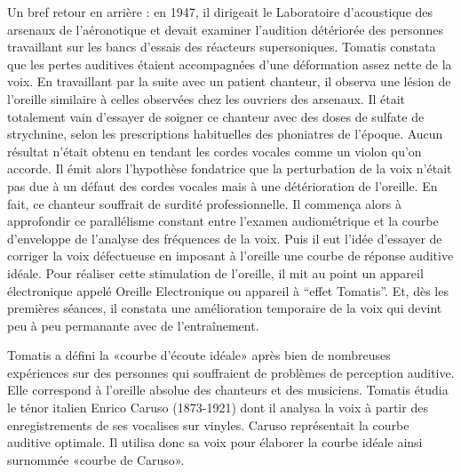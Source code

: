 \documentclass[12pt,french]{report}
\begin{document}
Un bref retour en arrière : en 1947, il dirigeait le Laboratoire d'acoustique
des arsenaux de l'aéronotique et devait examiner l'audition détériorée
des personnes travaillant sur les bancs d'essais des réacteurs supersoniques.
Tomatis constata que les pertes auditives étaient accompagnées d'une
déformation assez nette de la voix. En travaillant par la suite avec
un patient chanteur, il observa une lésion de l'oreille similaire
à celles observées chez les ouvriers des arsenaux. Il était totalement
vain d'essayer de soigner ce chanteur avec des doses de sulfate de
strychnine, selon les prescriptions habituelles des phoniatres de
l'époque. Aucun résultat n'était obtenu en tendant les cordes vocales
comme un violon qu'on accorde. Il émit alors l'hypothèse fondatrice
que la perturbation de la voix n'était pas due à un défaut des cordes
vocales mais à une détérioration de l'oreille. En fait, ce chanteur
souffrait de surdité professionnelle. Il commença alors à approfondir
ce parallélisme constant entre l'examen audiométrique et la courbe
d'enveloppe de l'analyse des fréquences de la voix. Puis il eut l'idée
d'essayer de corriger la voix défectueuse en imposant à l'oreille
une courbe de réponse auditive idéale. Pour réaliser cette stimulation
de l'oreille, il mit au point un appareil électronique appelé Oreille
Electronique ou appareil à ``effet Tomatis''. Et, dès les premières
séances, il constata une amélioration temporaire de la voix qui devint
peu à peu permanante avec de l'entraînement. 

Tomatis a défini la «courbe d\textquoteright écoute idéale» après
bien de nombreuses expériences sur des personnes qui souffraient de
problèmes de perception auditive. Elle correspond à l'oreille absolue
des chanteurs et des musiciens. Tomatis étudia le ténor italien Enrico
Caruso (1873-1921) dont il analysa la voix à partir des enregistrements
de ses vocalises sur vinyles. Caruso représentait la courbe auditive
optimale. Il utilisa donc sa voix pour élaborer la courbe idéale ainsi
surnommée «courbe de Caruso».
\end{document}
